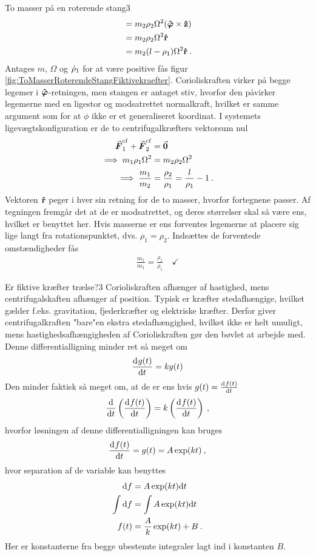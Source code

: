 \begin{opgave}{To masser på en roterende stang}{3}
\begin{align*}
	&= m_2\rho_2\Omega^2(\phhat \times \zhat) \\
	&= m_2\rho_2\Omega^2\rhat \\
	&= m_2(l-\rho_1)\Omega^2\rhat \: .
\end{align*}
\opg Antages $m$, $\Omega$ og $\dt{\rho}_1$ for at være positive fås figur \ref{fig:ToMasserRoterendeStangFiktivekraefter}.
\opg Corioliskraften virker på begge legemer i $\phhat$-retningen, men stangen er antaget stiv, hvorfor den påvirker legemerne med en ligestor og modsatrettet normalkraft, hvilket er samme argument som for at $\phi$ ikke er et generaliseret koordinat.
\opg I systemets ligevægtskonfiguration er de to centrifugalkræfters vektorsum nul
\begin{align*}
	\v{F}_1^\mathrm{cf} + \v{F}_2^\mathrm{cf} &= \v{0} \\
	\implies m_1\rho_1\Omega^2 &= m_2\rho_2\Omega^2 \\
	\implies \frac{m_1}{m_2} &= \frac{\rho_2}{\rho_1} = \frac{l}{\rho_1} - 1 \: .
\end{align*}
Vektoren $\rhat$ peger i hver sin retning for de to masser, hvorfor fortegnene passer. Af tegningen fremgår det at de er modsatrettet, og deres størrelser skal så være ens, hvilket er benyttet her.
\opg Hvis masserne er ens forventes legemerne at placere sig lige langt fra rotationspunktet, dvs. $\rho_1 = \rho_2$.
\opg Indsættes de forventede omstændigheder fås
\begin{align*}
	\frac{m_1}{m_1} = \frac{\rho_1}{\rho_1} \quad \checkmark
\end{align*}
\end{opgave}
%
%
\begin{opgave}{Er fiktive kræfter trælse?}{3}
\opg Corioliskraften afhænger af hastighed, mens centrifugalskaften afhænger af position.
\opg Typisk er kræfter stedafhængige, hvilket gælder f.eks. gravitation, fjederkræfter og elektriske kræfter. Derfor giver centrifugalkraften "bare"\;en ekstra stedafhængighed, hvilket ikke er helt umuligt, mens hastighedsafhængigheden af Corioliskraften gør den bøvlet at arbejde med.
\opg Denne differentialligning minder ret så meget om
\begin{align*}
	\dif{t}{g(t)} = kg(t)
\end{align*}
Den minder faktisk så meget om, at de er ens hvis $g(t) = \dif{t}{f(t)}$
\begin{align*}
	\dif{t}{}\left(\dif{t}{f(t)}\right) = k\left(\dif{t}{f(t)}\right) \: ,
\end{align*}
hvorfor løsningen af denne differentialligningen kan bruges
\begin{align*}
	\dif{t}{f(t)} = g(t) = A\exp(kt) \: ,
\end{align*}
hvor separation af de variable kan benyttes
\begin{align*}
	\d f &= A\exp(kt)\d t \\
	\int \d f &= \int A\exp(kt)\d t \\
	f(t) &= \frac{A}{k}\exp(kt) + B \: .
\end{align*}
Her er konstanterne fra begge ubestemte integraler lagt ind i konstanten $B$.
\end{opgave}
%
%
